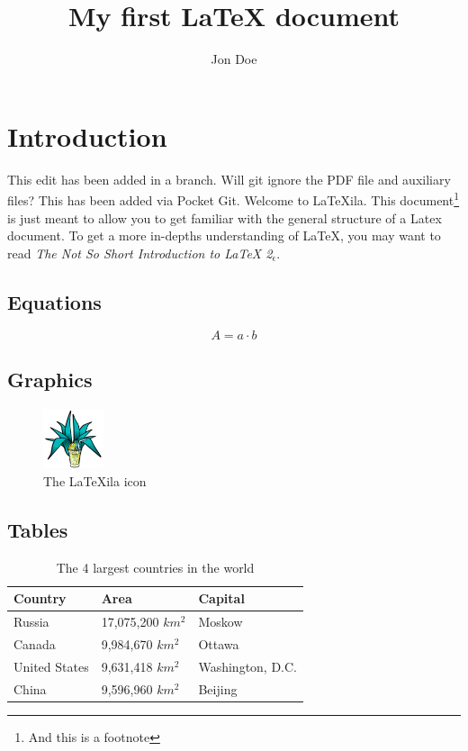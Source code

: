 \documentclass[a4paper,11pt]{article}
\title{My first \LaTeX{} document}
\author{Jon Doe}
\begin{document}
\maketitle
\tableofcontents

\newpage
\section{Introduction}
This edit has been added in a branch. Will git ignore the PDF file and auxiliary files? This has been added via Pocket Git. \cite{Johnston.2003}
Welcome to \LaTeX ila. This document\footnote{And this is a footnote} is just meant to allow you to get
familiar with the general structure of a Latex document. To get a more in-depths understanding of LaTeX, you may want to read \emph{The Not So Short Introduction to \LaTeX{} 2$_\epsilon$}.

\subsection{Equations}
\begin{equation}
    A=a \cdot b
\end{equation}

\subsection{Graphics}
\begin{figure}[h]
    \begin{center}
        \includegraphics[width=50pt,height=50pt]{./latexila.png}
        \caption{The LaTeXila icon}
    \end{center}
\end{figure}

\subsection{Tables}
\begin{table}[h]
    \begin{center}
        \begin{tabular}{|l|l|l|}
            \hline
            Country         & Area                 & Capital\\ \hline
            Russia          & 17,075,200 $km^2$    & Moskow \\ \hline
            Canada          & 9,984,670 $km^2$     & Ottawa \\ \hline
            United States   & 9,631,418 $km^2$     & Washington, D.C. \\ \hline
            China           & 9,596,960 $km^2$     & Beijing \\ \hline
        \end{tabular}
    \end{center}
    \caption{The 4 largest countries in the world}
\end{table}

\newpage

\end{document}
